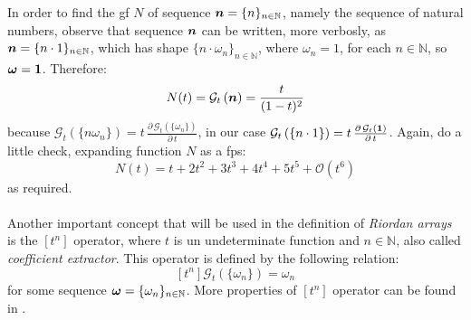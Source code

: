 In order to find the \ac{gf} $N$ of sequence $\boldsymbol{n}=\lbrace
n\rbrace_{n\in\mathbb{N}}$, namely the sequence of natural numbers, observe
that sequence $\boldsymbol{n}$ can be written, more verbosly, as $\boldsymbol{n}=\lbrace
n\cdot1\rbrace_{n\in\mathbb{N}}$, which has shape $\lbrace
n\cdot\omega_{n}\rbrace_{n\in\mathbb{N}}$, where $\omega_{n}=1$, for each
$n\in\mathbb{N}$, so $\boldsymbol{\omega}=\boldsymbol{1}$. Therefore:
\begin{equation}
    N(t)=\mathcal{G}_{t}\left(\boldsymbol{n}\right) =\frac{t}{(1-t)^{2}}
    \label{eq:n:gf}
\end{equation}
because $\mathcal{G}_{t}\left(\lbrace n\omega_{n}\rbrace\right) =t\,
\frac{\partial\,\mathcal{G}_{t}\left(\lbrace
\omega_{n}\rbrace\right)}{\partial\,t}$, in our case
$\mathcal{G}_{t}\left(\lbrace n\cdot1\rbrace\right) =
t\,\frac{\partial\,\mathcal{G}_{t}\left(\boldsymbol{1}\right)}{\partial\,t}$.
Again, do a little check, expanding function $N$ as a \ac{fps}:
\begin{displaymath}
    N(t)=t+2t^{2}+3t^{3}+4t^{4}+5t^{5}+\mathcal{O}(t^{6})
\end{displaymath}
as required.
\\\\
Another important concept that will be used in the definition of
\emph{Riordan arrays} is the $\left[t^{n}\right]$ operator, where
$t$ is un undeterminate function and $n\in\mathbb{N}$, also called
\emph{coefficient extractor}. This operator is defined by the following
relation:
\begin{equation}
    \left[t^{n}\right]\mathcal{G}_{t}\left(\lbrace\omega_{n}\rbrace\right) = \omega_{n}
    \label{eq:coefficient:extractor:def}
\end{equation}
for some sequence $\boldsymbol{\omega}=\lbrace\omega_{n}\rbrace_{n\in\mathbb{N}}$. More properties
of $\left[t^{n}\right]$ operator can be found in \cite{merlini:method:of:coefficient}.




